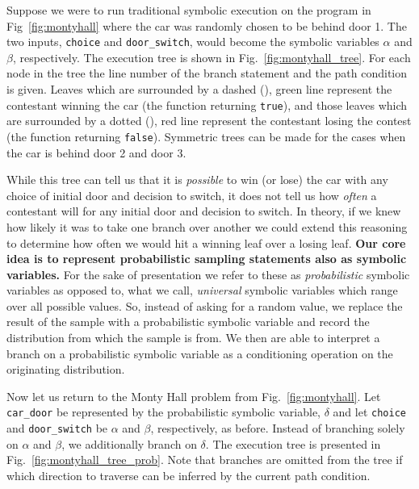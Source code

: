 \documentclass[acmsmall,review]{acmart}\settopmatter{}
\begin{document}
	
	Suppose we were to run traditional symbolic execution on the program in Fig~\ref{fig:montyhall} where the car was randomly chosen to be behind door 1.
	The two inputs, \texttt{choice} and \texttt{door\_switch}, would become the symbolic variables $\alpha$ and $\beta$, respectively.
	The execution tree is shown in Fig.~\ref{fig:montyhall_tree}.
	For each node in the tree the line number of the branch statement and the path condition is given.
	Leaves which are surrounded by a dashed (), {\color{darkgreen} green} line represent the contestant winning the car (the function returning \texttt{true}), and those leaves which are surrounded by a dotted (), {\color{red} red} line represent the contestant losing the contest (the function returning \texttt{false}).
	Symmetric trees can be made for the cases when the car is behind door 2 and door 3.
	
	
	While this tree can tell us that it is \textit{possible} to win (or lose) the car with any choice of initial door and decision to switch, it does not tell us how \textit{often} a contestant will for any initial door and decision to switch.
	In theory, if we knew how likely it was to take one branch over another we could extend this reasoning to determine how often we would hit a winning leaf over a losing leaf.
	\textbf{Our core idea is to represent probabilistic sampling statements also as symbolic variables.}
	For the sake of presentation we refer to these as \textit{probabilistic} symbolic variables as opposed to, what we call, \textit{universal} symbolic variables which range over all possible values.
	So, instead of asking for a random value, we replace the result of the sample with a probabilistic symbolic variable and record the distribution from which the sample is from.
	We then are able to interpret a branch on a probabilistic symbolic variable as a conditioning operation on the originating distribution.
	
	
	Now let us return to the Monty Hall problem from Fig.~\ref{fig:montyhall}.
	Let \texttt{car\_door} be represented by the probabilistic symbolic variable, $\delta$ and let \texttt{choice} and \texttt{door\_switch} be $\alpha$ and $\beta$, respectively, as before.
	Instead of branching solely on $\alpha$ and $\beta$, we additionally branch on $\delta$.
	The execution tree is presented in Fig.~\ref{fig:montyhall_tree_prob}.
	Note that branches are omitted from the tree if which direction to traverse can be inferred by the current path condition.
	
\end{document}
